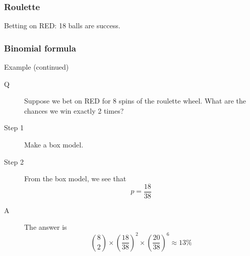 \documentclass[handout]{beamer}
\begin{document}


   \begin{frame}
   \frametitle{Roulette}
   \begin{center}
   \end{center}
   Betting on {\color{red} RED}: 18 balls are success.
   \end{frame}


   \begin{frame} \frametitle{Binomial formula}

   \begin{block}
   {Example (continued)}
   \begin{description}

   \item[Q] Suppose we bet on {\color{red} RED} for 8 spins of the roulette wheel.
   What are the chances we win exactly 2 times?

   \item[Step 1] Make a box model.
   \item[Step 2] From the box model, we see that
   $$
   p = \frac{18}{38}
   $$
   \item[A] The answer is
   $$
   \binom{8}{2} \times \left(\frac{18}{38}\right)^2 \times \left( \frac{20}{38} \right)^6 \approx 13\%
   $$
   \end{description}
   \end{block}
   \end{frame}
\end{document}
